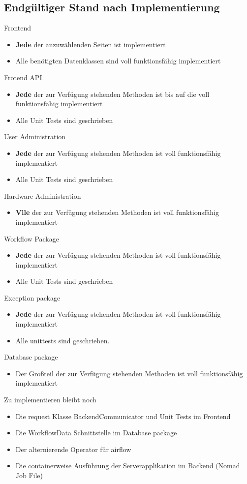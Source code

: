 \subsection{Endgültiger Stand nach Implementierung}
Frontend
\begin{itemize}
    \item \textbf{Jede} der anzuwählenden Seiten ist implementiert
    \item Alle benötigten Datenklassen sind voll funktionsfähig implementiert
\end{itemize}
Frotend API
\begin{itemize}
    \item \textbf{Jede} der zur Verfügung stehenden Methoden ist bis auf die  voll funktionsfähig implementiert
    \item Alle Unit Tests sind geschrieben
\end{itemize}
User Administration
\begin{itemize}
    \item \textbf{Jede} der zur Verfügung stehenden Methoden ist voll funktionsfähig implementiert
    \item Alle Unit Tests sind geschrieben
\end{itemize}
Hardware Administration
\begin{itemize}
    \item \textbf{Vile} der zur Verfügung stehenden Methoden ist voll funktionsfähig implementiert
\end{itemize}
Workflow Package
\begin{itemize}
    \item \textbf{Jede} der zur Verfügung stehenden Methoden ist voll funktionsfähig implementiert
    \item Alle Unit Tests sind geschrieben
\end{itemize}
Exception package
\begin{itemize}
    \item \textbf{Jede} der zur Verfügung stehenden Methoden ist voll funktionsfähig implementiert
    \item Alle unittests sind geschrieben.
\end{itemize}
Database package
\begin{itemize}
    \item Der Großteil der zur Verfügung stehenden Methoden ist voll funktionsfähig implementiert
\end{itemize}
Zu implementieren bleibt noch
\begin{itemize}
    \item Die request Klasse BackendCommunicator und Unit Tests im Frontend
    \item Die WorkflowData Schnittstelle im Database package
    \item Der alternierende Operator für airflow
    \item Die containerweise Ausführung der Serverapplikation im Backend (Nomad Job File)
\end{itemize}